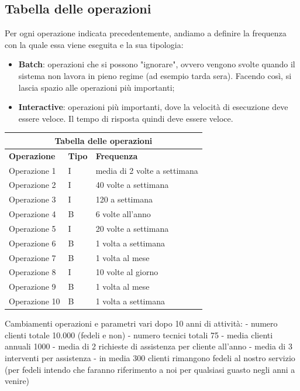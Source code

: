 \documentclass[legalpaper]{article}
\begin{document}
	\subsection{Tabella delle operazioni}
	Per ogni operazione indicata precedentemente, andiamo a definire la frequenza con la quale essa viene eseguita e la sua tipologia:
	\begin{itemize}
		\item \textbf{Batch}: operazioni che si possono "ignorare", ovvero vengono svolte quando il sistema non lavora in pieno regime (ad esempio tarda sera). Facendo così, si lascia spazio alle operazioni più importanti;
		\item \textbf{Interactive}: operazioni più importanti, dove la velocità di esecuzione deve essere veloce. Il tempo di risposta quindi deve essere veloce.
	\end{itemize}
		\renewcommand\arraystretch{2}
		\begin{tabular}{ |p{5cm}|p{2cm}|p{5cm}| }
			\hline
			\multicolumn{3}{|c|}{\textbf{Tabella delle operazioni}} \\
			\hline
			\textbf{Operazione} & \textbf{Tipo} & \textbf{Frequenza} \\
			\hline
			Operazione 1 & I &  media di 2 volte a settimana \\ \hline
			Operazione 2 & I & 40 volte a settimana \\ \hline
			Operazione 3 & I & 120 a settimana \\ \hline
			Operazione 4 & B & 6 volte all'anno \\ \hline
			Operazione 5 & I & 20 volte a settimana \\ \hline
			Operazione 6 & B & 1 volta a settimana \\ \hline
			Operazione 7 & B & 1 volta al mese \\ \hline
			Operazione 8 & I & 10 volte al giorno \\ \hline
			Operazione 9 & B & 1 volta al mese \\ \hline
			Operazione 10 & B & 1 volta a settimana \\ \hline
		
		\end{tabular}	 
	
	Cambiamenti operazioni e parametri vari dopo 10 anni di attività: 
	- numero clienti totale 10.000 (fedeli e non)
	- numero tecnici totali 75
	- media clienti annuali 1000
	- media di 2 richieste di assistenza per cliente all'anno
	- media di 3 interventi per assistenza
	- in media 300 clienti rimangono fedeli al nostro servizio (per fedeli intendo che faranno riferimento a noi per qualsiasi guasto negli anni a venire)
	
\end{document}
